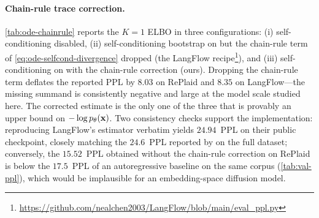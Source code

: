 \documentclass{article}
\begin{document}
\paragraph{Chain-rule trace correction.} \cref{tab:ode-chainrule} reports the $K=1$ ELBO in three configurations: (i) self-conditioning disabled, (ii) self-conditioning bootstrap on but the chain-rule term of \cref{eq:ode-selfcond-divergence} dropped (the LangFlow recipe\footnote{\url{https://github.com/nealchen2003/LangFlow/blob/main/eval_ppl.py}}), and (iii) self-conditioning on with the chain-rule correction (ours). Dropping the chain-rule term deflates the reported PPL by $8.03$ on RePlaid and $8.35$ on LangFlow---the missing summand is consistently negative and large at the model scale studied here. The corrected estimate is the only one of the three that is provably an upper bound on $-\log p_\theta({\mathbf x})$. Two consistency checks support the implementation: reproducing LangFlow's estimator verbatim yields $24.94$~PPL on their public checkpoint, closely matching the $24.6$~PPL reported by \citet{chen2026langflow} on the full dataset; conversely, the $15.52$~PPL obtained without the chain-rule correction on RePlaid is below the $17.5$~PPL of an autoregressive baseline on the same corpus (\cref{tab:val-ppl}), which would be implausible for an embedding-space diffusion model.
\end{document}

